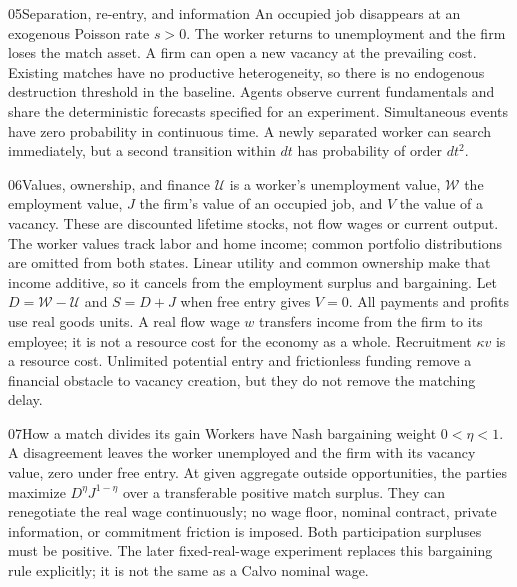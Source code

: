 \begin{modelsetup}[1]
\begin{modelcondition}{05}{Separation, re-entry, and information}
An occupied job disappears at an exogenous Poisson rate $s>0$. The worker
returns to unemployment and the firm loses the match asset. A firm can open
a new vacancy at the prevailing cost. Existing matches have no productive
heterogeneity, so there is no endogenous destruction threshold in the baseline.
Agents observe current fundamentals and share the deterministic forecasts
specified for an experiment. Simultaneous events have zero probability in
continuous time. A newly separated worker can search immediately, but a second
transition within $dt$ has probability of order $dt^2$.
\end{modelcondition}
\end{modelsetup}

\begin{modelsetup}[1]
\begin{modelcondition}{06}{Values, ownership, and finance}
$\mathcal U$ is a worker's unemployment value, $\mathcal W$ the employment
value, $J$ the firm's value of an occupied job, and $V$ the value of a vacancy.
These are discounted lifetime stocks, not flow wages or current output.
The worker values track labor and home income; common portfolio distributions
are omitted from both states. Linear utility and common ownership make that
income additive, so it cancels from the employment surplus and bargaining.
Let $D=\mathcal W-\mathcal U$ and $S=D+J$ when free entry gives $V=0$.
All payments and profits use real goods units. A real flow wage $w$ transfers
income from the firm to its employee; it is not a resource cost for the
economy as a whole. Recruitment $\kappa v$ is a resource cost. Unlimited
potential entry and frictionless funding remove a financial obstacle to
vacancy creation, but they do not remove the matching delay.
\end{modelcondition}
\end{modelsetup}

\begin{modelsetup}[1]
\begin{modelcondition}{07}{How a match divides its gain}
Workers have Nash bargaining weight $0<\eta<1$. A disagreement leaves the
worker unemployed and the firm with its vacancy value, zero under free entry.
At given aggregate outside opportunities, the parties maximize
$D^\eta J^{1-\eta}$ over a transferable positive match surplus. They can
renegotiate the real wage continuously; no wage floor, nominal contract,
private information, or commitment friction is imposed. Both participation
surpluses must be positive. The later fixed-real-wage experiment replaces
this bargaining rule explicitly; it is not the same as a Calvo nominal wage.
\end{modelcondition}
\end{modelsetup}

